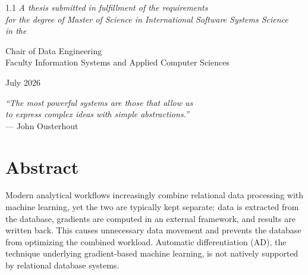 \documentclass[12pt]{report}
\begin{document}
\begin{titlepage}
\begin{center}

\begin{spacing}{1.1}
\textit{
A thesis submitted in fulfillment of the requirements\\
for the degree of Master of Science in International Software Systems Science\\
in the
}
\end{spacing}

\vspace{0.5cm}

Chair of Data Engineering\\
Faculty Information Systems and Applied Computer Sciences

\vfill

July 2026

\end{center}

\end{titlepage}


\newpage


\vspace*{4cm}

\begin{flushright}
\textit{
``The most powerful systems are those that allow us\\
to express complex ideas with simple abstractions.''
}
\\[1cm]
--- John Ousterhout
\end{flushright}

\newpage



\chapter*{Abstract}
Modern analytical workflows increasingly combine relational data processing
with machine learning, yet the two are typically kept separate: data is
extracted from the database, gradients are computed in an external
framework, and results are written back. This causes unnecessary data
movement and prevents the database from optimizing the combined workload.
Automatic differentiation (AD), the technique underlying gradient-based
machine learning, is not natively supported by relational database systems.
\end{document}

